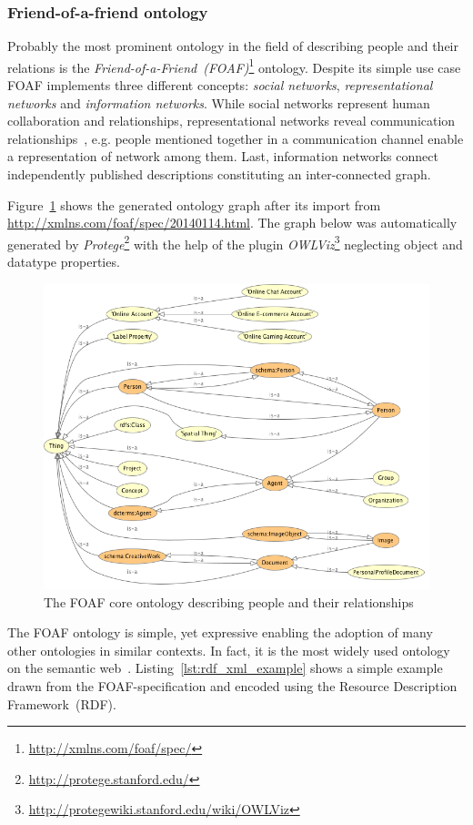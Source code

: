 \documentclass{article}
\begin{document}
\subsubsection{Friend-of-a-friend ontology}
Probably the most prominent ontology in the field of describing people and their relations is the \textit{Friend-of-a-Friend~(FOAF)}\footnote{\url{http://xmlns.com/foaf/spec/}} ontology. Despite its simple use case FOAF implements three different concepts: \textit{social networks}, \textit{representational networks} and \textit{information networks}. 
While social networks represent human collaboration and relationships, representational networks reveal communication relationships~\cite{book:encyclopedia-social-network}, e.g. people mentioned together in a communication channel enable a representation of network among them. Last, information networks connect independently published descriptions constituting an inter-connected graph.

Figure~\ref{fig:foaf-ontology} shows the generated ontology graph after its import from \url{http://xmlns.com/foaf/spec/20140114.html}.
The graph below was automatically generated by \textit{Protege}\footnote{\url{http://protege.stanford.edu/}} with the help of the plugin \textit{OWLViz}\footnote{\url{http://protegewiki.stanford.edu/wiki/OWLViz}} neglecting object and datatype properties.
\begin{figure}[H]
	\centering \includegraphics*[width=.8\columnwidth]{foaf-ontology.png}
	\caption{The FOAF core ontology describing people and their relationships}
	\label{fig:foaf-ontology}
\end{figure}
The FOAF ontology is simple, yet expressive enabling the adoption of many other ontologies in similar contexts. In fact, it is the most widely used ontology on the semantic web~\cite{article:social-networking}. Listing~\ref{lst:rdf_xml_example} shows a simple example drawn from the FOAF-specification and encoded using the Resource Description Framework~(RDF)\cite{article:rdf}.
\end{document}
